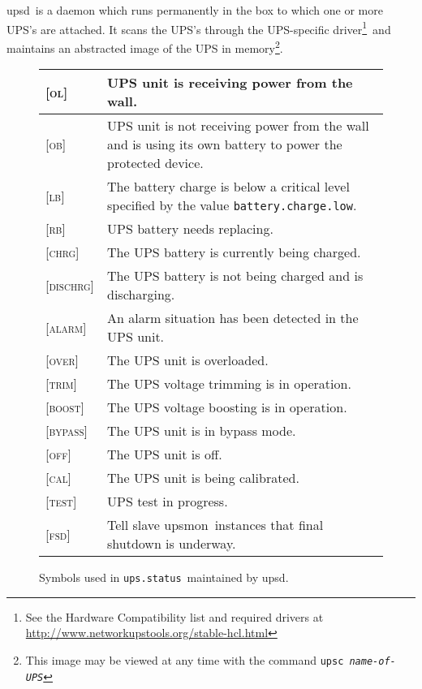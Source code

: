 \documentclass[12pt]{article}
\newcommand{\upsd}{\mbox{\textcolor{UPSDCOLOUR}{upsd}}}
\newcommand{\upsmon}{\mbox{\textcolor{MONCOLOUR}{upsmon}}}
\newcommand{\ALARM}{\textcolor{UPSDCOLOUR}{\textsc{alarm}}}
\newcommand{\BOOST}{\textcolor{UPSDCOLOUR}{\textsc{boost}}}
\newcommand{\BYPASS}{\textcolor{UPSDCOLOUR}{\textsc{bypass}}}
\newcommand{\CAL}{\textcolor{UPSDCOLOUR}{\textsc{cal}}}
\newcommand{\CHRG}{\textcolor{UPSDCOLOUR}{\textsc{chrg}}}
\newcommand{\DISCHRG}{\textcolor{UPSDCOLOUR}{\textsc{dischrg}}}
\newcommand{\FSDst}{\textcolor{UPSDCOLOUR}{\textsc{fsd}}}
\newcommand{\LB}{\textcolor{UPSDCOLOUR}{\textsc{lb}}}
\newcommand{\OB}{\textcolor{UPSDCOLOUR}{\textsc{ob}}}
\newcommand{\OFF}{\textcolor{UPSDCOLOUR}{\textsc{off}}}
\newcommand{\OL}{\textcolor{UPSDCOLOUR}{\textsc{ol}}}
\newcommand{\OVER}{\textcolor{UPSDCOLOUR}{\textsc{over}}}
\newcommand{\RB}{\textcolor{UPSDCOLOUR}{\textsc{rb}}}
\newcommand{\TEST}{\textcolor{UPSDCOLOUR}{\textsc{test}}}
\newcommand{\TRIM}{\textcolor{UPSDCOLOUR}{\textsc{trim}}}
\newcommand{\status}[1]{\textcolor{UPSDCOLOUR}{[{#1}]}}
\newcommand{\batterychargelow}{\textcolor{UPSDCOLOUR}{\texttt{battery{\allowbreak}.charge{\allowbreak}.low}}}
\newcommand{\upsstatus}{\textcolor{UPSDCOLOUR}{\texttt{ups{\allowbreak}.status}}}
\newcommand{\hardwarelist}{\footnote{See the Hardware Compatibility list and required drivers at 
                         \href{http://www.networkupstools.org/stable-hcl.html}%
                              {http://{\allowbreak}www.networkupstools.org/{\allowbreak}stable-hcl.html}}}
\begin{document}
\upsd\ is a daemon which runs permanently in the box to which one or more
UPS's are attached.  It scans the UPS's through the UPS-specific
driver\hardwarelist\ and maintains an abstracted image of the UPS in
memory\footnote{This image may be viewed at any time with the command
  \texttt{upsc \textsl{name-of-UPS}}}.

\begin{figure}[ht]
\begin{center}
\begin{tabular}{|l|p{0.7\LinePrinterwidth}|}
\hline
\status{\OL}      & UPS unit is receiving power from the wall.  \\ \hline
\status{\OB}      & UPS unit is not receiving power from the wall and is using its
                    own battery to power the protected device. \\ \hline
\status{\LB}      & The battery charge is below a critical level specified by the 
                    value \batterychargelow. \\ \hline
\status{\RB}      & UPS battery needs replacing.  \\ \hline
\status{\CHRG}    & The UPS battery is currently being charged. \\ \hline
\status{\DISCHRG} & The UPS battery is not being charged and is discharging.  \\ \hline
\status{\ALARM}   & An alarm situation has been detected in the UPS unit. \\ \hline
\status{\OVER}    & The UPS unit is overloaded. \\ \hline
\status{\TRIM}    & The UPS voltage trimming is in operation. \\ \hline
\status{\BOOST}   & The UPS voltage boosting is in operation. \\ \hline
\status{\BYPASS}  & The UPS unit is in bypass mode. \\ \hline
\status{\OFF}     & The UPS unit is off. \\ \hline
\status{\CAL}     & The UPS unit is being calibrated. \\ \hline
\status{\TEST}    & UPS test in progress. \\ \hline
\status{\FSDst}   & Tell slave \upsmon\ instances that final shutdown is underway. \\ \hline
\end{tabular}
\caption{Symbols used in \upsstatus\ maintained by \upsd.\label{fig:statussymbols}}
\end{center}
\end{figure}
\end{document}
